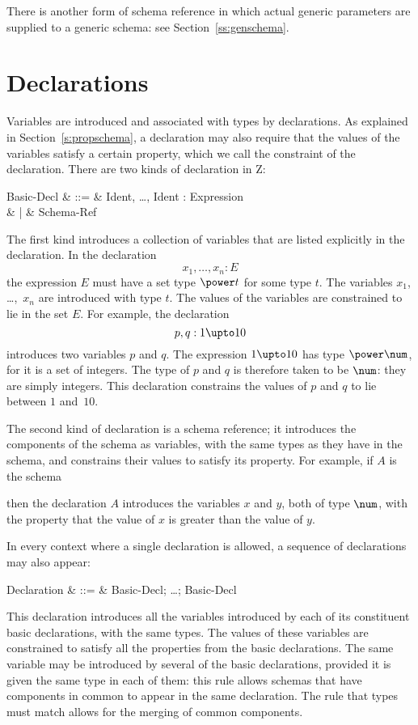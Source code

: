 There is another form of schema reference in which actual generic
parameters are supplied to a generic schema: see
Section~\ref{ss:genschema}.

\section{Declarations}\label{s:decl}

Variables are introduced and associated with types by
declarations.  As explained in
Section~\ref{s:propschema}, a declaration may also require that the
values of the variables satisfy a certain property, which we call the
constraint of the declaration.
There are two kinds of declaration in Z:
\begin{syntax}
        Basic-Decl
                & ::= & Ident, \ldots, Ident : Expression \\
                &  |  & Schema-Ref
\end{syntax}
The first kind introduces a collection of variables that are listed
explicitly in the declaration. In the declaration
\[ x_1, \ldots, x_n: E \]
the expression $E$ must have a set type $\power t$ for some type
$t$. The variables $x_1$, \dots,~$x_n$ are introduced with type
$t$. The values of the variables are constrained to lie in the
set $E$. For example, the declaration
\[ p, q: 1 \upto 10 \]
introduces two variables $p$ and $q$. The expression $1 \upto 10$ has
type $\power \num$, for it is a set of integers. The type of $p$
and $q$ is therefore taken to be $\num$: they are simply integers.
This declaration constrains the values of $p$ and $q$ to lie between
$1$ and~$10$.

The second kind of declaration is a schema reference; it introduces the components of the
schema as variables, with the same types as they have in the schema,
and constrains their values to satisfy its property. For example, if
$A$ is the schema
then the declaration $A$ introduces the variables $x$ and $y$,
both of type $\num$, with the property that the value of $x$ is
greater than the value of $y$.

In every context where a single declaration is allowed, a sequence
of declarations may also appear:
\begin{syntax}
        Declaration
                & ::= & Basic-Decl; \ldots; Basic-Decl
\end{syntax}
This declaration introduces all the variables introduced by each
of its constituent basic declarations, with the same types. The
values of these variables are constrained to satisfy all the properties
from the basic declarations. The same variable may be introduced by
several of the basic declarations, provided it is given the 
same type\label{p:combdecl}
in each of them: this rule allows schemas that have components in
common to appear in the same declaration. The rule that types must match
allows for the merging of common components.

